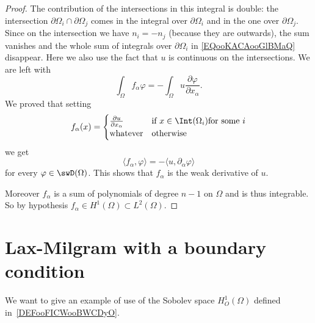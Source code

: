 \begin{proof}
    The contribution of the intersections in this integral is double: the intersection \( \partial\Omega_i\cap\partial\Omega_j\) comes in the integral over \( \partial\Omega_i\) and in the one over \( \partial\Omega_j\). Since on the intersection we have \( n_i=-n_j\) (because they are outwards), the sum vanishes and the whole sum of integrals over \( \partial\Omega_i\) in \eqref{EQooKACAooGlBMaQ} disappear. Here we also use the fact that \( u\) is continuous on the intersections. We are left with
    \begin{equation}
        \int_{\Omega}f_{\alpha}\varphi=-\int_{\Omega}u\frac{ \partial \varphi }{ \partial x_{\alpha} }.
    \end{equation}
    We proved that setting
    \begin{equation}
        f_{\alpha}(x)=\begin{cases}
            \frac{ \partial u }{ \partial x_{\alpha} }    &   \text{if } x\in\Int(\Omega_i) \text{for some }i\\
            \text{whatever}    &    \text{otherwise }
        \end{cases}
    \end{equation}
    we get
    \begin{equation}
        \langle f_{\alpha}, \varphi\rangle =-\langle u, \partial_{\alpha}\varphi\rangle
    \end{equation}
    for every \( \varphi\in\swD(\Omega)\). This shows that \( f_{\alpha}\) is the weak derivative of \( u\).

    Moreover \( f_{\alpha}\) is a sum of polynomials of degree \( n-1\) on \( \Omega\) and is thus integrable. So by hypothesis \( f_{\alpha}\in H^1(\Omega)\subset L^2(\Omega)\).
\end{proof}

\section{Lax-Milgram with a boundary condition}

We want to give an example of use of the Sobolev space \( H_O^1(\Omega)\) defined in~\ref{DEFooFICWooBWCDyO}.

